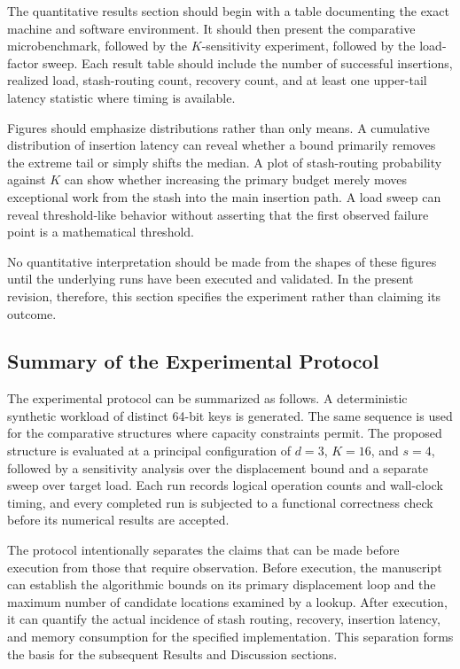 \documentclass[conference]{IEEEtran}
\begin{document}
The quantitative results section should begin with a table documenting the
exact machine and software environment. It should then present the comparative
microbenchmark, followed by the $K$-sensitivity experiment, followed by the
load-factor sweep. Each result table should include the number of successful
insertions, realized load, stash-routing count, recovery count, and at least one
upper-tail latency statistic where timing is available.

Figures should emphasize distributions rather than only means. A cumulative
distribution of insertion latency can reveal whether a bound primarily removes
the extreme tail or simply shifts the median. A plot of stash-routing
probability against $K$ can show whether increasing the primary budget merely
moves exceptional work from the stash into the main insertion path. A load
sweep can reveal threshold-like behavior without asserting that the first
observed failure point is a mathematical threshold.

No quantitative interpretation should be made from the shapes of these figures
until the underlying runs have been executed and validated. In the present
revision, therefore, this section specifies the experiment rather than claiming
its outcome.

\subsection{Summary of the Experimental Protocol}

The experimental protocol can be summarized as follows. A deterministic
synthetic workload of distinct 64-bit keys is generated. The same sequence is
used for the comparative structures where capacity constraints permit. The
proposed structure is evaluated at a principal configuration of $d=3$,
$K=16$, and $s=4$, followed by a sensitivity analysis over the displacement
bound and a separate sweep over target load. Each run records logical operation
counts and wall-clock timing, and every completed run is subjected to a
functional correctness check before its numerical results are accepted.

The protocol intentionally separates the claims that can be made before
execution from those that require observation. Before execution, the manuscript
can establish the algorithmic bounds on its primary displacement loop and the
maximum number of candidate locations examined by a lookup. After execution, it
can quantify the actual incidence of stash routing, recovery, insertion latency,
and memory consumption for the specified implementation. This separation forms
the basis for the subsequent Results and Discussion sections.
\end{document}
